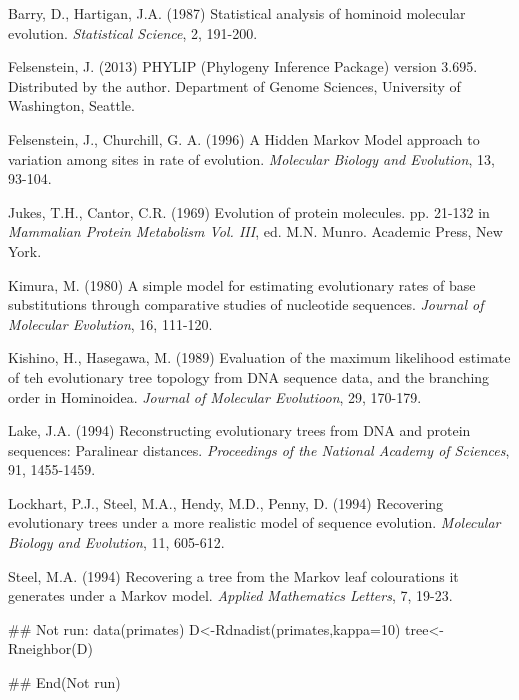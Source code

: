 \documentclass[a4paper]{book}
\begin{document}
\begin{References}\relax

Barry, D., Hartigan, J.A. (1987) Statistical analysis of hominoid molecular evolution. \emph{Statistical Science}, 2, 191-200.

Felsenstein, J. (2013) PHYLIP (Phylogeny Inference Package) version 3.695. Distributed by the author. Department of Genome Sciences, University of Washington, Seattle.

Felsenstein, J., Churchill, G. A. (1996) A Hidden Markov Model approach to variation among sites in rate of evolution. \emph{Molecular Biology and Evolution}, 13, 93-104.

Jukes, T.H., Cantor, C.R. (1969) Evolution of protein molecules. pp. 21-132 in \emph{Mammalian Protein Metabolism Vol. III}, ed. M.N. Munro. Academic Press, New York.

Kimura, M. (1980) A simple model for estimating evolutionary rates of base substitutions through comparative studies of nucleotide sequences. \emph{Journal of Molecular Evolution}, 16, 111-120.

Kishino, H., Hasegawa, M. (1989) Evaluation of the maximum likelihood estimate of teh evolutionary tree topology from DNA sequence data, and the branching order in Hominoidea. \emph{Journal of Molecular Evolutioon}, 29, 170-179.

Lake, J.A. (1994) Reconstructing evolutionary trees from DNA and protein sequences: Paralinear distances. \emph{Proceedings of the National Academy of Sciences}, 91, 1455-1459.

Lockhart, P.J., Steel, M.A., Hendy, M.D., Penny, D. (1994) Recovering evolutionary trees under a more realistic model of sequence evolution. \emph{Molecular Biology and Evolution}, 11, 605-612.

Steel, M.A. (1994) Recovering a tree from the Markov leaf colourations it generates under a Markov model. \emph{Applied Mathematics Letters}, 7, 19-23.
\end{References}
%
\begin{SeeAlso}\relax
{}
\end{SeeAlso}
%
\begin{Examples}
\begin{ExampleCode}
## Not run: 
data(primates)
D<-Rdnadist(primates,kappa=10)
tree<-Rneighbor(D)

## End(Not run)
\end{ExampleCode}
\end{Examples}
\end{document}
